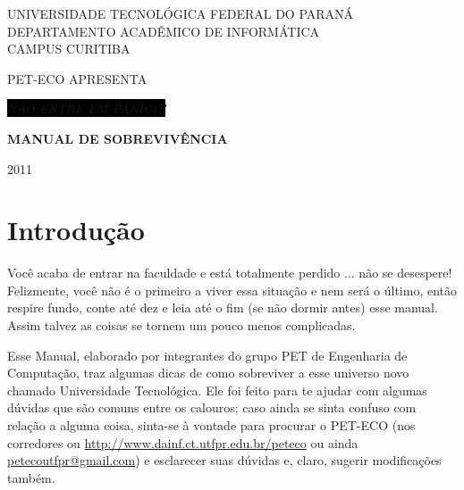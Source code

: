 \documentclass[a4paper,12pt,openany]{article}
\newcommand\BackgroundPic{
\put(0,0){
\parbox[b][\paperheight]{\paperwidth}{
\vfill
\centering
\vfill
}}}
\begin{document}
	\begin{titlepage}
	
	\AddToShipoutPicture*{\BackgroundPic}

        \begin{center}
            UNIVERSIDADE TECNOLÓGICA FEDERAL DO PARANÁ\\
            DEPARTAMENTO ACADÊMICO DE INFORMÁTICA\\
            CAMPUS CURITIBA
          
            \vspace{2cm}
            
            PET-ECO APRESENTA

            \vfill

            {\Huge \emph{\colorbox{black}{\color{red} NÃO ENTRE EM PÂNICO!}} }
            

            \vspace{13cm}
            
            {\LARGE \textbf{\color{blue} MANUAL DE SOBREVIVÊNCIA} }

            \vfill
            
            2011
        \end{center}

	\end{titlepage}

\thispagestyle{empty}
\tableofcontents

\newpage
\section{Introdução}

Você acaba de entrar na faculdade e está totalmente perdido  ... não se desespere! Felizmente, você não é o primeiro a viver essa situação e nem será o último, então respire fundo, conte até dez e leia até o fim (se não dormir antes) esse manual. Assim talvez as coisas se tornem um pouco menos complicadas. 

Esse Manual, elaborado por integrantes do grupo PET de Engenharia de Computação, traz algumas dicas de como sobreviver a esse universo novo chamado Universidade Tecnológica. Ele foi feito para te ajudar com algumas dúvidas que são comuns entre os calouros; caso ainda se sinta confuso com relação a alguma coisa, sinta-se à vontade para procurar o PET-ECO (nos corredores ou \url{http://www.dainf.ct.utfpr.edu.br/peteco} ou ainda \href{mailto:petecoutfpr@gmail.com}{petecoutfpr@gmail.com}) e esclarecer suas dúvidas e, claro, sugerir modificações também.
\end{document}
